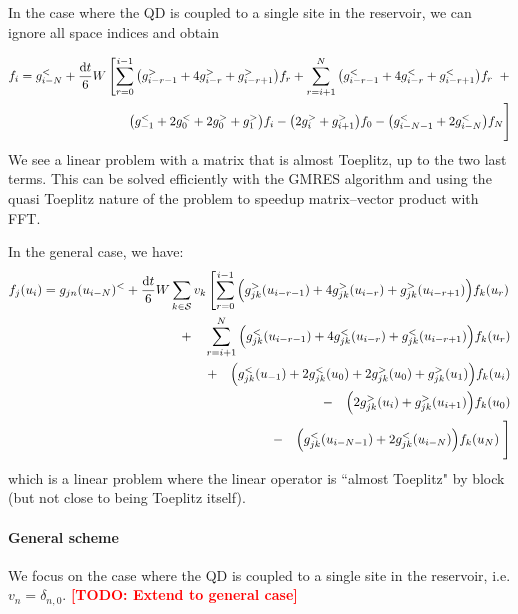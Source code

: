 \documentclass[12pt]{article}
\newcommand\TODO[1]{\textcolor{red}{\textbf{[TODO: #1]}}}
\begin{document}
In the case where the \ac{QD} is coupled to a single site in the reservoir, we can ignore all space indices and obtain

\begin{equation}
	\begin{split}
	f_i = g_{i - N}^< + \frac{\dd{t}}{6} W \left[
	 \sum_{r=0}^{i-1} \qty(g^>_{i-r-1} + 4 g^>_{i - r} + g^>_{i-r + 1}) f_{r} +
	 \sum_{r=i+1}^{N} \qty(g^<_{i-r-1} + 4 g^<_{i - r} + g^<_{i-r+1}) f_{r} \;\; + \right.
	 \\
	 \left. \qty(g^<_{-1} + 2 g^<_{0} + 2 g^>_{0} + g^>_{1}) f_{i}
	 - \qty(2 g^>_{i} + g^>_{i + 1}) f_{0}
	 - \qty(g^<_{i-N-1} + 2 g^<_{i-N}) f_N
	 \vphantom{\sum_{i=0}^N}\right]
	 \end{split}
\end{equation}
We see a linear problem with a matrix that is almost Toeplitz, up to the two last terms. This can be solved efficiently with the GMRES algorithm and using the quasi Toeplitz nature of the problem to speedup matrix--vector product with FFT.

In the general case, we have:
\begin{equation}
	\begin{split}
		f_{j}(u_i) = g_{jn}(u_{i-N})^< + \frac{\dd{t}}{6} W \sum_{k \in \mathcal{S}} v_k \left[
		\sum_{r=0}^{i-1} \qty(g^>_{jk}(u_{i-r-1}) + 4 g^>_{jk}(u_{i-r}) + g^>_{jk}(u_{i-r+1})) f_{k}(u_r) \right.
		\\
		+ \quad \sum_{r=i+1}^{N} \qty(g^<_{jk}(u_{i-r-1}) + 4 g^<_{jk}(u_{i-r}) + g^<_{jk}(u_{i-r+1})) f_{k}(u_r)
		\\
		+ \quad \qty(g^<_{jk}(u_{-1}) + 2 g^<_{jk}(u_0) + 2 g^>_{jk}(u_0) + g^>_{jk}(u_1)) f_{k}(u_i)
		\\
		-\quad \qty(2 g^>_{jk}(u_i) + g^>_{jk}(u_{i+1})) f_{k}(u_0)
		\\
		-\quad \qty(g^<_{jk}(u_{i-N-1}) + 2 g^<_{jk}(u_{i-N})) f_{k}(u_{N})
		\left. \vphantom{\sum_{i=0}^N}\right]
	\end{split}
\end{equation}
which is a linear problem where the linear operator is ``almost Toeplitz" by block (but not close to being Toeplitz itself).

\paragraph{General scheme}

We focus on the case where the \ac{QD} is coupled to a single site in the reservoir, i.e. $v_n = \delta_{n,0}$.
\TODO{Extend to general case}
\end{document}
